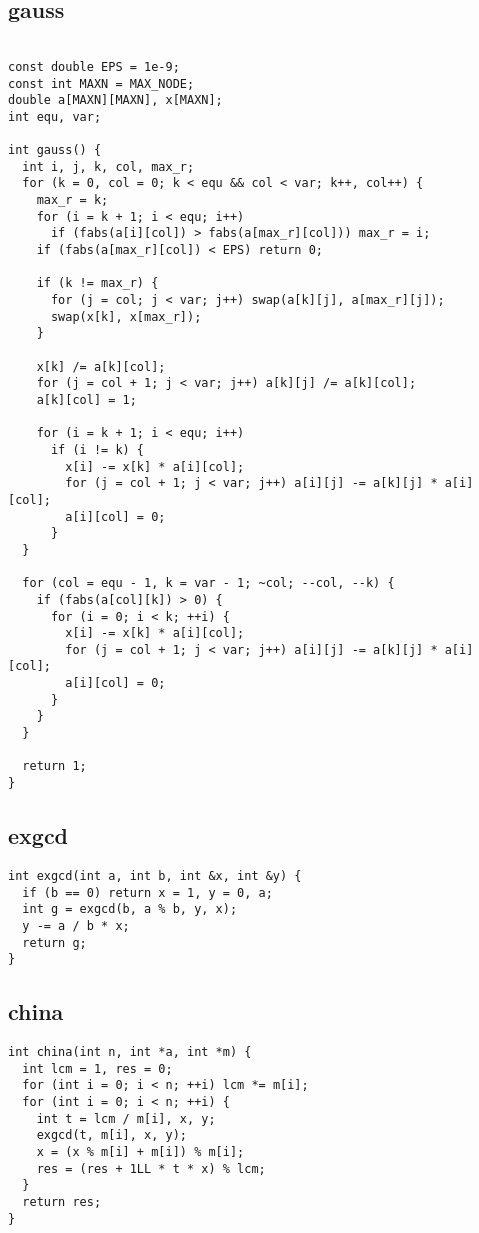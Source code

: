 \documentclass[twoside]{article}
\begin{document}
\subsection{gauss}
\begin{lstlisting}

const double EPS = 1e-9;
const int MAXN = MAX_NODE;
double a[MAXN][MAXN], x[MAXN];
int equ, var;

int gauss() {
  int i, j, k, col, max_r;
  for (k = 0, col = 0; k < equ && col < var; k++, col++) {
    max_r = k;
    for (i = k + 1; i < equ; i++)
      if (fabs(a[i][col]) > fabs(a[max_r][col])) max_r = i;
    if (fabs(a[max_r][col]) < EPS) return 0;

    if (k != max_r) {
      for (j = col; j < var; j++) swap(a[k][j], a[max_r][j]);
      swap(x[k], x[max_r]);
    }

    x[k] /= a[k][col];
    for (j = col + 1; j < var; j++) a[k][j] /= a[k][col];
    a[k][col] = 1;

    for (i = k + 1; i < equ; i++)
      if (i != k) {
        x[i] -= x[k] * a[i][col];
        for (j = col + 1; j < var; j++) a[i][j] -= a[k][j] * a[i][col];
        a[i][col] = 0;
      }
  }

  for (col = equ - 1, k = var - 1; ~col; --col, --k) {
    if (fabs(a[col][k]) > 0) {
      for (i = 0; i < k; ++i) {
        x[i] -= x[k] * a[i][col];
        for (j = col + 1; j < var; j++) a[i][j] -= a[k][j] * a[i][col];
        a[i][col] = 0;
      }
    }
  }

  return 1;
}

\end{lstlisting}
\subsection{exgcd}
\begin{lstlisting}
int exgcd(int a, int b, int &x, int &y) {
  if (b == 0) return x = 1, y = 0, a;
  int g = exgcd(b, a % b, y, x);
  y -= a / b * x;
  return g;
}

\end{lstlisting}
\subsection{china}
\begin{lstlisting}
int china(int n, int *a, int *m) {
  int lcm = 1, res = 0;
  for (int i = 0; i < n; ++i) lcm *= m[i];
  for (int i = 0; i < n; ++i) {
    int t = lcm / m[i], x, y;
    exgcd(t, m[i], x, y);
    x = (x % m[i] + m[i]) % m[i];
    res = (res + 1LL * t * x) % lcm;
  }
  return res;
}

\end{lstlisting}
\end{document}
